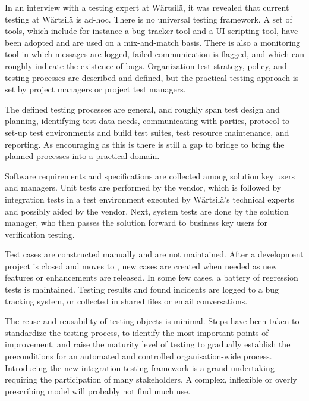 \documentclass[12pt,a4paper,oneside,pdftex]{report}
\begin{document}
In an interview with a testing expert at Wärtsilä, it was revealed that current testing at Wärtsilä is ad-hoc. There is no universal testing framework. A set of tools, which include for instance a bug tracker tool and a UI scripting tool, have been adopted and are used on a mix-and-match basis. There is also a monitoring tool in which messages are logged, failed communication is flagged, and which can roughly indicate the existence of bugs. Organization test strategy, policy, and testing processes are described and defined, but the practical testing approach is set by project managers or project test managers. 

The defined testing processes are general, and roughly span test design and planning, identifying test data needs, communicating with parties, protocol to set-up test environments and build test suites, test resource maintenance, and reporting. As encouraging as this is there is still a gap to bridge to bring the planned processes into a practical domain. 


Software requirements and specifications are collected among solution key users and managers. Unit tests are performed by the vendor, which is followed by integration tests in a test environment executed by Wärtsilä's technical experts and possibly aided by the vendor. Next, system tests are done by the solution manager, who then passes the solution forward to business key users for verification testing. %

Test cases are constructed manually and are not maintained. After a development project is closed and moves to , new cases are created when needed as new features or enhancements are released. In some few cases, a battery of regression tests is maintained. Testing results and found incidents are logged to a bug tracking system, or collected in shared files or email conversations. 

The reuse and reusability of testing objects is minimal. Steps have been taken to standardize the testing process, to identify the most important points of improvement, and raise the maturity level of testing to gradually establish the preconditions for an automated and controlled organisation-wide process. Introducing the new integration testing framework is a grand undertaking requiring the participation of many stakeholders. A complex, inflexible or overly prescribing model will probably not find much use.
\end{document}
